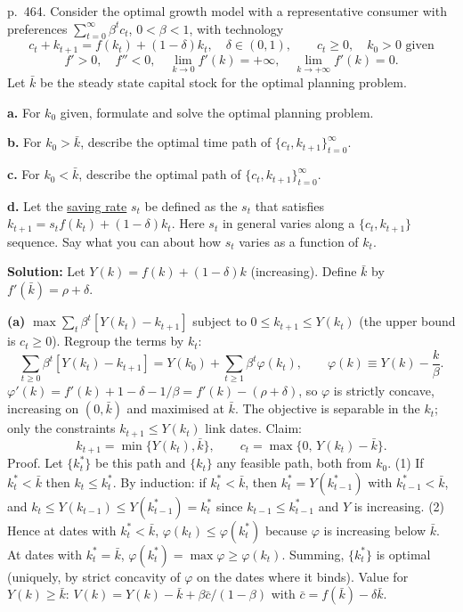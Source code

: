 \documentclass[12pt, letterpaper]{article}
\newcommand{\kb}{\bar k}
\newcommand{\cb}{\bar c}
\begin{document}
\begin{tcolorbox}[oddbox,title={Exercise 11.13 \quad Optimal growth with linear utility}]
\begin{tcolorbox}[questionbox]
p.~464. Consider the optimal growth model with a representative consumer with preferences $\sum_{t=0}^\infty\beta^tc_t$,
$0<\beta<1$, with technology
\[
c_t+k_{t+1}=f(k_t)+(1-\delta)k_t,\quad\delta\in(0,1),\qquad c_t\ge0,\quad k_0>0\text{ given}
\]
\[
f'>0,\quad f''<0,\quad\lim_{k\to0}f'(k)=+\infty,\quad\lim_{k\to+\infty}f'(k)=0 .
\]
Let $\bar k$ be the steady state capital stock for the optimal planning problem.

\textbf{a.} For $k_0$ given, formulate and solve the optimal planning problem.

\textbf{b.} For $k_0>\bar k$, describe the optimal time path of $\{c_t,k_{t+1}\}_{t=0}^\infty$.

\textbf{c.} For $k_0<\bar k$, describe the optimal path of $\{c_t,k_{t+1}\}_{t=0}^\infty$.

\textbf{d.} Let the \underline{saving rate} $s_t$ be defined as the $s_t$ that satisfies
$k_{t+1}=s_tf(k_t)+(1-\delta)k_t$. Here $s_t$ in general varies along a $\{c_t,k_{t+1}\}$ sequence. Say what you can
about how $s_t$ varies as a function of $k_t$.
\end{tcolorbox}

\textbf{Solution:} Let $Y(k)=f(k)+(1-\delta)k$ (increasing). Define $\kb$ by $f'(\kb)=\rho+\delta$.

\textbf{(a)} $\max\sum_t\beta^t[Y(k_t)-k_{t+1}]$ subject to $0\le k_{t+1}\le Y(k_t)$ (the upper bound is $c_t\ge0$).
Regroup the terms by $k_t$:
\[
\sum_{t\ge0}\beta^t[Y(k_t)-k_{t+1}]=Y(k_0)+\sum_{t\ge1}\beta^t\varphi(k_t),\qquad\varphi(k)\equiv Y(k)-\frac k\beta .
\]
$\varphi'(k)=f'(k)+1-\delta-1/\beta=f'(k)-(\rho+\delta)$, so $\varphi$ is strictly concave, increasing on $(0,\kb)$ and
maximised at $\kb$. The objective is separable in the $k_t$; only the constraints $k_{t+1}\le Y(k_t)$ link dates. Claim:
\[
\boxed{k_{t+1}=\min\{Y(k_t),\kb\},\qquad c_t=\max\{0,\,Y(k_t)-\kb\}.}
\]
Proof. Let $\{k^\ast_t\}$ be this path and $\{k_t\}$ any feasible path, both from $k_0$. (1) If $k^\ast_t<\kb$ then
$k_t\le k^\ast_t$. By induction: if $k^\ast_t<\kb$, then $k^\ast_t=Y(k^\ast_{t-1})$ with $k^\ast_{t-1}<\kb$, and
$k_t\le Y(k_{t-1})\le Y(k^\ast_{t-1})=k^\ast_t$ since $k_{t-1}\le k^\ast_{t-1}$ and $Y$ is increasing. (2) Hence at dates
with $k^\ast_t<\kb$, $\varphi(k_t)\le\varphi(k^\ast_t)$ because $\varphi$ is increasing below $\kb$. At dates with
$k^\ast_t=\kb$, $\varphi(k^\ast_t)=\max\varphi\ge\varphi(k_t)$. Summing, $\{k^\ast_t\}$ is optimal (uniquely, by strict
concavity of $\varphi$ on the dates where it binds). Value for $Y(k)\ge\kb$:
$V(k)=Y(k)-\kb+\beta\cb/(1-\beta)$ with $\cb=f(\kb)-\delta\kb$.


\end{tcolorbox}
\end{document}
